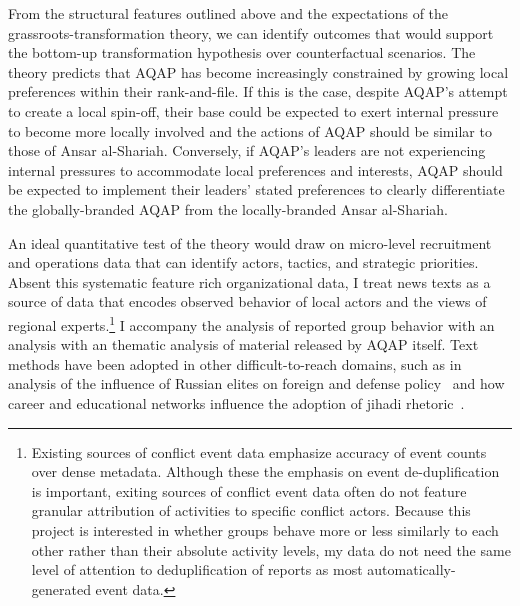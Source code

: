 From the structural features outlined above and the expectations of the grassroots-transformation theory, we can identify outcomes that would support the bottom-up transformation hypothesis over counterfactual scenarios.  The theory predicts that AQAP has become increasingly constrained by growing local preferences within their rank-and-file. If this is the case, despite AQAP's attempt to create a local spin-off, their base could be expected to exert internal pressure to become more locally involved and the actions of AQAP should be similar to those of Ansar al-Shariah. Conversely, if AQAP's leaders are not experiencing internal pressures to accommodate local preferences and interests, AQAP should be expected to implement their leaders' stated preferences to clearly differentiate the globally-branded AQAP from the locally-branded Ansar al-Shariah. 

An ideal quantitative test of the theory would draw on micro-level recruitment and operations data that can identify actors, tactics, and strategic priorities. Absent this systematic feature rich organizational data, I treat news texts as a source of data that encodes observed behavior of local actors and the views of regional experts.\footnote{Existing sources of conflict event data emphasize accuracy of event counts over dense metadata. Although these the emphasis on event de-duplification is important, exiting sources of conflict event data often do not feature granular attribution of activities to specific conflict actors. Because this project is interested in whether groups behave more or less similarly to each other rather than their absolute activity levels, my data do not need the same level of attention to deduplification of reports as most automatically-generated event data.} I accompany the analysis of reported group behavior with an analysis with an thematic analysis of material released by AQAP itself. Text methods have been adopted in other difficult-to-reach domains, such as in analysis of the influence of Russian elites on foreign and defense policy~\autocite{baturo2013life, stewart2009use} and how career and educational networks influence the adoption of jihadi rhetoric~\autocite{nielson2014networks}.

